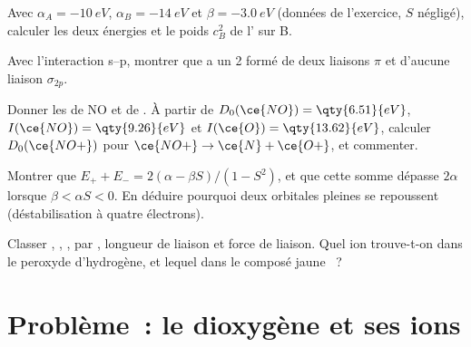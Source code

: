 \begin{exercise}[$\star\star$]\label{exo:b2:diatomic-mos:8}
Avec $\alpha_A = \qty{-10}{eV}$, $\alpha_B = \qty{-14}{eV}$ et $\beta = \qty{-3.0}{eV}$
(données de l'exercice, $S$ négligé), calculer les deux énergies et le poids $c_B^2$ de
l' sur B.
\end{exercise}

\begin{exercise}[$\star\star$]\label{exo:b2:diatomic-mos:9}
Avec l'interaction s--p, montrer que  a un  2 formé de deux liaisons $\pi$ et d'aucune
liaison $\sigma_{2p}$.
\end{exercise}

\begin{exercise}[$\star\star\star$]\label{exo:b2:diatomic-mos:10}
Donner les  de NO et de . À partir de $D_0(\ce{NO}) = \qty{6.51}{eV}$, $I(\ce{NO}) =
\qty{9.26}{eV}$ et $I(\ce{O}) = \qty{13.62}{eV}$, calculer $D_0(\ce{NO+})$ pour $\ce{NO+} \to
\ce{N} + \ce{O+}$, et commenter.
\end{exercise}

\begin{exercise}[$\star\star\star$]\label{exo:b2:diatomic-mos:11}
Montrer que $E_+ + E_- = 2(\alpha - \beta S)/(1 - S^2)$, et que cette somme dépasse $2\alpha$ lorsque
$\beta < \alpha S < 0$. En déduire pourquoi deux orbitales pleines se repoussent (déstabilisation
à quatre électrons).
\end{exercise}

\begin{exercise}[$\star\star\star$]\label{exo:b2:diatomic-mos:12}
Classer , , ,  par , longueur de liaison et force de
liaison. Quel ion trouve-t-on dans le peroxyde d'hydrogène, et lequel dans le composé
jaune ~?
\end{exercise}

\section{Problème~: le dioxygène et ses ions}

